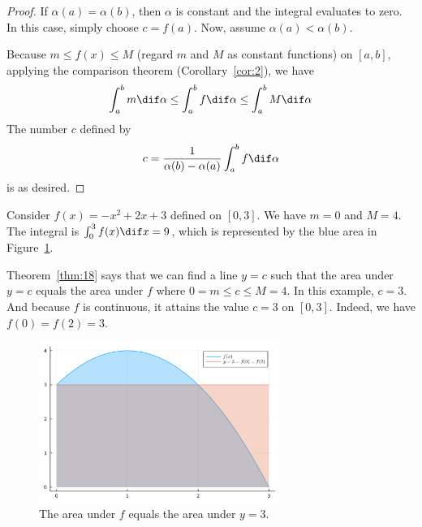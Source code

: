 \documentclass[thmcnt=section, color=blue, 12pt]{my-elegantbook}
\begin{document}
\begin{proof}
	If $\alpha(a) = \alpha(b)$, then $\alpha$ is constant
	and the integral evaluates to zero.
	In this case, simply choose $c = f(a)$.
	Now, assume $\alpha(a) < \alpha(b)$.

	Because $m \leq f(x) \leq M$
	(regard $m$ and $M$ as constant functions) on $[a, b]$,
	applying the comparison theorem (Corollary~\ref{cor:2}), we have
	\begin{align*}
		\int_a^b m \dif \alpha
		\leq \int_a^b f \dif \alpha
		\leq \int_a^b M \dif \alpha
	\end{align*}
	The number $c$ defined by
	\begin{align*}
		c = \frac{1}{\alpha(b) - \alpha(a)} \int_a^b f \dif \alpha
	\end{align*}
	is as desired.
\end{proof}

\begin{example}

	Consider $f(x) = -x^2 + 2x + 3$ defined on $[0, 3]$.
	We have $m = 0$ and $M = 4$.
	The integral is $\int_0^3 f(x) \dif x = 9$,
	which is represented by the blue area in Figure~\ref{fig:7}.

	Theorem~\ref{thm:18} says that we can find a line $y = c$ such that
	the area under $y = c$ equals the area under $f$
	where $0 = m \leq c \leq M =  4$.
	In this example, $c = 3$.
	And because $f$ is continuous, it attains the value $c = 3$ on $[0, 3]$.
	Indeed, we have $f(0) = f(2) = 3$.


	\begin{figure}[H]
		\centering
		\includegraphics[width=0.7\textwidth]{figures/mean-value-theorem-for-riemann-stieltjes-integrals-first-mean-value-theorem.png}
		\caption{The area under $f$ equals the area under $y = 3$.}
		\label{fig:7}
	\end{figure}

\end{example}
\end{document}

